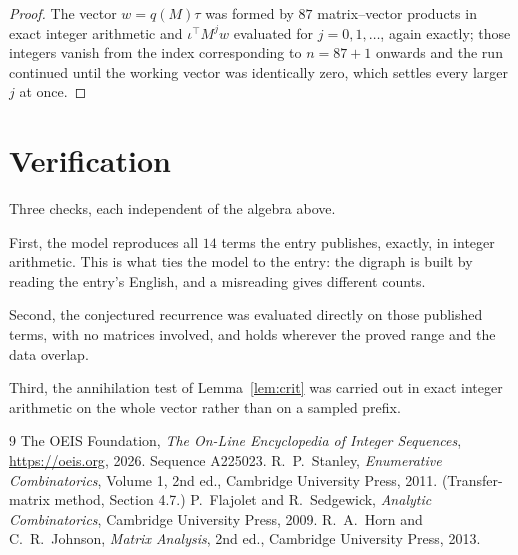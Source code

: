 \documentclass[11pt,a4paper]{article}
\theoremstyle{plain}
\theoremstyle{definition}
\begin{document}
\begin{proof}
The vector $w=q(M)\tau$ was formed by $87$ matrix--vector products in exact integer
arithmetic and $\iota^{\!\top}M^{j}w$ evaluated for $j=0,1,\dots$, again exactly; those
integers vanish from the index corresponding to $n=87+1$ onwards and the run continued
until the working vector was identically zero, which settles every larger $j$ at once.
\end{proof}

\section{Verification}

Three checks, each independent of the algebra above.

First, the model reproduces all $14$ terms the entry publishes, exactly, in integer
arithmetic. This is what ties the model to the entry: the digraph is built by reading the
entry's English, and a misreading gives different counts.

Second, the conjectured recurrence was evaluated directly on those published terms, with no
matrices involved, and holds wherever the proved range and the data overlap.

Third, the annihilation test of Lemma~\ref{lem:crit} was carried out in exact integer
arithmetic on the whole vector rather than on a sampled prefix.

\begin{thebibliography}{9}
 The OEIS Foundation, \emph{The On-Line Encyclopedia of Integer
Sequences}, \url{https://oeis.org}, 2026. Sequence A225023.
 R.~P.~Stanley, \emph{Enumerative Combinatorics}, Volume 1, 2nd ed.,
Cambridge University Press, 2011. (Transfer-matrix method, Section 4.7.)
 P.~Flajolet and R.~Sedgewick, \emph{Analytic Combinatorics}, Cambridge
University Press, 2009.
 R.~A.~Horn and C.~R.~Johnson, \emph{Matrix Analysis}, 2nd ed., Cambridge
University Press, 2013.
\end{thebibliography}
\end{document}

